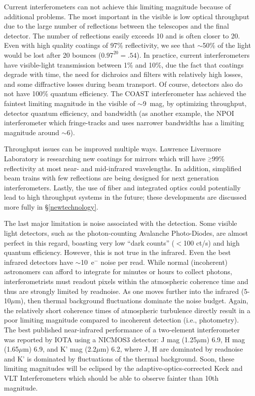 \documentclass[12pt]{article}
\newcommand{\simge}{\mbox{$\stackrel{>}{_{\sim}}$}}
\begin{document}
Current interferometers can not achieve this
limiting magnitude because of additional problems.  The most important
in the visible is low optical throughput due to the large
number of reflections between the telescopes and the final detector.
The number of reflections easily exceeds 10 and is often closer to 20.
Even with high quality coatings of 97\% reflectivity, we see that
$\sim$50\% of the light would be lost after 20 bounces
($0.97^{20}=.54$).  In practice, current interferometers have
visible-light transmission between 1\% and 10\%, due the fact that
coatings degrade with time, the need for dichroics and filters with
relatively high losses, and some diffractive losses during beam
transport.  Of course, detectors also do not have 100\% quantum
efficiency.  The COAST interferometer has achieved the faintest
limiting magnitude in the visible of $\sim$9~mag, by optimizing
throughput, detector quantum efficiency, and bandwidth (as another
example, the NPOI interferometer which fringe-tracks and uses narrower
bandwidths has a limiting magnitude around $\sim$6).

Throughput issues can be improved multiple ways.
Lawrence Livermore Laboratory is researching new coatings for mirrors
which will have $\simge$99\% reflectivity at most near- and mid-infrared
wavelengths.  In addition, simplified beam trains with few
reflections are being designed for next generation interferometers.
Lastly, the use of fiber and integrated optics could potentially
lead to high throughput systems in the future; these developments are
discussed more fully in \S\ref{newtechnology}.

The last major limitation is noise associated with the detection.
Some visible light detectors, such as the photon-counting Avalanche
Photo-Diodes, are almost perfect in this regard, boasting very low
``dark counts'' ($<$100 ct/s) and high quantum efficiency. However,
this is not true in the infrared.  Even the best infrared detectors
have $\sim$10~e$^{-}$ noise per read. While normal (incoherent)
astronomers can afford to integrate for minutes or hours to collect
photons, interferometrists must readout pixels within the atmospheric
coherence time and thus are strongly limited by readnoise.  As one
moves further into the infrared (5-10$\mu$m), then thermal background
fluctuations dominate the noise budget.  Again, the relatively short
coherence times of atmospheric turbulence directly result in a poor
limiting magnitude compared to incoherent detection (i.e.,
photometry).  The best published near-infrared performance of a
two-element interferometer was reported by IOTA \citep{rmg1999b} using
a NICMOS3 detector: J mag (1.25$\mu$m) 6.9, H mag (1.65$\mu$m) 6.9,
and K' mag (2.2$\mu$m) 6.2, where J, H are dominated by readnoise and
K' is dominated by fluctuations of the thermal background.  Soon,
these limiting magnitudes will be eclipsed by the
adaptive-optics-corrected Keck and VLT Interferometers which should be
able to observe fainter than 10th magnitude.
\end{document}
